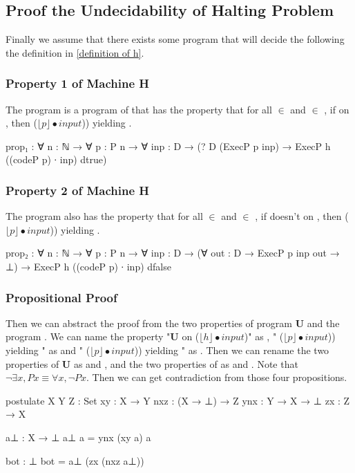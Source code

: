 \subsection{Proof the Undecidability of Halting Problem}
Finally we assume that there exists some program  that will decide the  following the definition in \ref{definition of h}.
\subsubsection{Property 1 of Machine H}
The program  is a program of \WHILE that has the property that for all  $\in$  and  $\in$ , if  \textbf{} on , then  ($\lfloor p\rfloor \bullet input$)) yielding .
\begin{code}
prop₁ : ∀ {n : ℕ} → ∀ {p : P n} → ∀ {inp : D}
	→ (? D (ExecP p inp) 
	→ ExecP h ((codeP p) ∙ inp) dtrue)
\end{code}
\subsubsection{Property 2 of Machine H}
The program  also has the property that for all  $\in$  and  $\in$ , if  doesn't \textbf{} on , then  ($\lfloor p\rfloor \bullet input$)) yielding .
\begin{code}
prop₂ : ∀ {n : ℕ} → ∀ {p : P n} → ∀ {inp : D}
	→ (∀ {out : D} → ExecP p inp out → ⊥) 
	→ ExecP h ((codeP p) ∙ inp) dfalse
\end{code}
\subsubsection{Propositional Proof}
Then we can abstract the proof from the two properties of program \textbf{U} and the program .
We can name the property "\textbf{U}  on ($\lfloor h\rfloor \bullet input$)" as , " ($\lfloor p\rfloor \bullet input$)) yielding " as  and " ($\lfloor p\rfloor \bullet input$)) yielding " as .
Then we can rename the two properties of \textbf{U} as  and , and the two properties of  as  and .
Note that $\neg\exists x, P x \equiv \forall x, \neg P x$.
Then we can get contradiction from those four propositions.
\begin{code}[fontsize=\small]
postulate
  X Y Z : Set
  xy  : X → Y
  nxz : (X → ⊥) → Z
  ynx : Y → X → ⊥
  zx  : Z → X

a⊥ : X → ⊥
a⊥ a = ynx (xy a) a

bot : ⊥
bot = a⊥ (zx (nxz a⊥))
\end{code}

